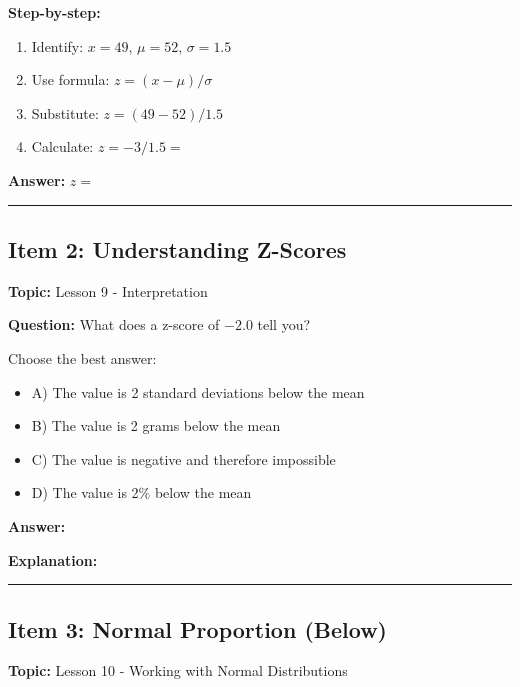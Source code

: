 \documentclass[11pt]{article}
\begin{document}
\textbf{Step-by-step:}
\begin{enumerate}
    \item Identify: $x = 49$, $\mu = 52$, $\sigma = 1.5$
    \item Use formula: $z = (x - \mu) / \sigma$
    \item Substitute: $z = (49 - 52) / 1.5$
    \item Calculate: $z = -3 / 1.5 = $ \underline{\hspace{1in}}
\end{enumerate}

\textbf{Answer:} $z = $ \underline{\hspace{1in}}

\vspace{1in}

\hrule

\vspace{0.2in}

\subsection*{Item 2: Understanding Z-Scores}
\textbf{Topic:} Lesson 9 - Interpretation

\textbf{Question:} What does a z-score of $-2.0$ tell you?

Choose the best answer:
\begin{itemize}[label=$\square$]
    \item A) The value is 2 standard deviations below the mean
    \item B) The value is 2 grams below the mean
    \item C) The value is negative and therefore impossible
    \item D) The value is 2\% below the mean
\end{itemize}

\textbf{Answer:} \underline{\hspace{1in}}

\textbf{Explanation:}

\vspace{1in}

\hrule

\vspace{0.2in}

\subsection*{Item 3: Normal Proportion (Below)}
\textbf{Topic:} Lesson 10 - Working with Normal Distributions
\end{document}
